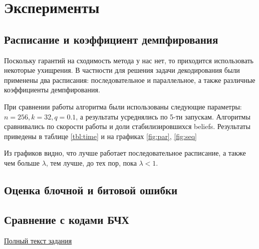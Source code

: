 \documentclass[12pt,a4paper]{article}
\begin{document}
\section{Эксперименты}

\subsection{Расписание и коэффициент демпфирования}

Поскольку гарантий на сходимость метода у нас нет, то приходится использовать некоторые ухищрения.
В частности для решения задачи декодирования были применены два расписания: последовательное и параллельное, а также различные коэффициенты демпфирования.

При сравнении работы алгоритма были использованы следующие параметры: $n = 256, k = 32, q = 0.1$, а результаты усреднялись по 5-ти запускам.
Алгоритмы сравнивались по скорости работы и доли стабилизировшихся beliefs.
Результаты приведены в таблице \ref{tbl:time} и на графиках \ref{fig:par}, \ref{fig:seq}


Из графиков видно, что лучше работает последовательное расписание, а также чем больше $\lambda$, тем лучше, до тех пор, пока $\lambda < 1$.

\subsection{Оценка блочной и битовой ошибки}



\subsection{Сравнение с кодами БЧХ}

\begin{thebibliography}{0}

  \href{http://www.machinelearning.ru/wiki/index.php?title=%D0%93%D1%80%D0%B0%D1%84%D0%B8%D1%87%D0%B5%D1%81%D0%BA%D0%B8%D0%B5_%D0%BC%D0%BE%D0%B4%D0%B5%D0%BB%D0%B8_%28%D0%BA%D1%83%D1%80%D1%81_%D0%BB%D0%B5%D0%BA%D1%86%D0%B8%D0%B9%29/2014/%D0%97%D0%B0%D0%B4%D0%B0%D0%BD%D0%B8%D0%B5_2}{Полный текст задания}

\end{thebibliography}
\end{document}
